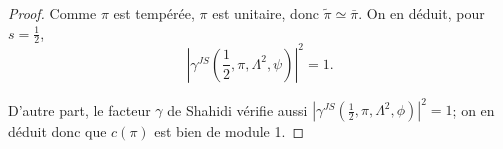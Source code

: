 \documentclass{amsart}
\begin{document}
\begin{proof}
 Comme $\pi$ est tempérée, $\pi$ est unitaire, donc $\tilde{\pi} \simeq \bar{\pi}$. On en déduit, pour $s = \frac{1}{2}$,
 \begin{equation}
 |\gamma^{JS}(\frac{1}{2}, \pi, \Lambda^2, \psi)|^2=1.
 \end{equation}
 
 D'autre part, le facteur $\gamma$ de Shahidi vérifie aussi $|\gamma^{JS}(\frac{1}{2}, \pi, \Lambda^2, \phi)|^2=1$; on en déduit donc que $c(\pi)$ est bien de module 1.
 \end{proof}
\end{document}
